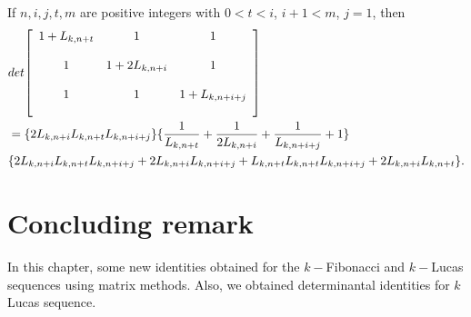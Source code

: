 \begin{corollary}
If  $n, i, j, t, m$ are positive integers with $0 < t < i$, $i+1 < m$, $j = 1$, then
\begin{align*}
&det {\left[
          \begin{array}{ccc}
           \bigskip
            1+L_{k, n+t}& 1 & 1 \\
             \bigskip
           1&  1+2 L_{k, n+i}& 1\\
     \bigskip
             1& 1 & 1+L_{k, n+i+j}\\       
          \end{array}
        \right]}\\
        & = \lbrace 2L_{k, n+i}L_{k, n+t}L_{k, n+i+j}\rbrace \lbrace \dfrac{1}{L_{k, n+t}}+ \dfrac{1}{2L_{k, n+i}}+\dfrac{1}{L_{k, n+i+j}}+1\rbrace \\
        &\lbrace 2L_{k, n+i}L_{k, n+t}L_{k, n+i+j}+2 L_{k, n+i}L_{k, n+i+j}+L_{k, n+t}L_{k, n+t}L_{k, n+i+j}+2L_{k, n+i}L_{k, n+t}\rbrace.
\end{align*}
\end{corollary}
\section{Concluding remark}
In this chapter, some new identities obtained for the $k-$Fibonacci and $k-$Lucas sequences using matrix methods. Also, we obtained determinantal identities for $k$ Lucas sequence.

